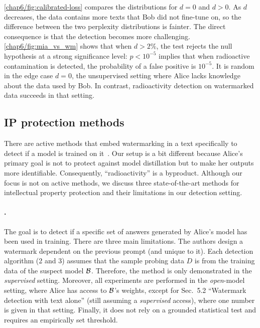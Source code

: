 \autoref{chap6/fig:calibrated-loss} compares the distributions for $d=0$ and $d>0$. 
As $d$ decreases, the data contains more texts that Bob did not fine-tune on, so the difference between the two perplexity distributions is fainter.
The direct consequence is that the detection becomes more challenging.
\autoref{chap6/fig:mia_vs_wm} shows that when $d>2\%$, the test rejects the null hypothesis at a strong significance level: 
$p < 10^{-5}$ implies that when radioactive contamination is detected, the probability of a false positive is $10^{-5}$.
It is random in the edge case $d=0$, the unsupervised setting where Alice lacks knowledge about the data used by Bob. 
In contrast, radioactivity detection on watermarked data succeeds in that setting.









\subsection{IP protection methods}\label{chap6/sec:ipp}

There are active methods that embed watermarking in a text specifically to detect if a model is trained on it~\citep{zhao2023protecting,he2022cater, he2022protecting}. 
Our setup is a bit different because Alice's primary goal is not to protect against model distillation but to make her outputs more identifiable. 
Consequently, ``radioactivity'' is a byproduct.
Although our focus is not on active methods, we discuss three state-of-the-art methods for intellectual property protection and their limitations in our detection setting.

\paragraph{\citet{zhao2023protecting}.}
The goal is to detect if a specific set of answers generated by Alice's model has been used in training. 
There are three main limitations.
The authors design a watermark dependent on the previous prompt (and unique to it). 
Each detection algorithm (2 and 3) assumes that the sample probing data $D$ is from the training data of the suspect model $\mathcal B$.
Therefore, the method is only demonstrated in the \textit{supervised} setting.
Moreover, all experiments are performed in the \textit{open}-model setting, where Alice has access to $\mathcal B$'s weights, except for Sec.~5.2 ``Watermark detection with text alone'' (still assuming a \textit{supervised} access), where one number is given in that setting.
Finally, it does not rely on a grounded statistical test and requires an empirically set threshold.

